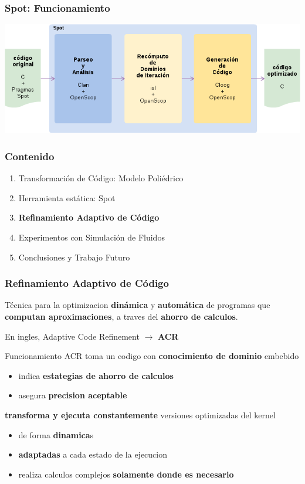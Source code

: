 \documentclass{beamer}\usetheme{Madrid} %
\begin{document}
\begin{frame}
\frametitle{Spot: Funcionamiento}
\includegraphics[scale=0.45]{img/spot_pipe_simple.png}
\end{frame}
\begin{frame} 
\frametitle{Contenido} 
\begin{enumerate}
\item Transformación de Código: Modelo Poliédrico
\item Herramienta estática: Spot
\item \textbf{Refinamiento Adaptivo de Código}
\item Experimentos con Simulación de Fluidos
\item Conclusiones y Trabajo Futuro
\end{enumerate}
\end{frame} 
\begin{frame}
\frametitle{Refinamiento Adaptivo de Código} 
\begin{block}{}
Técnica para la optimizacion \textbf{dinámica} y \textbf{automática} de programas que 
\textbf{computan aproximaciones}, a traves del \textbf{ahorro de calculos}.
\end{block}
En ingles, Adaptive Code Refinement $\rightarrow$ \textbf{ACR}
\begin{block}{Funcionamiento} 
ACR toma un codigo con \textbf{conocimiento de dominio} embebido
\begin{itemize}
	\item indica \textbf{estategias de ahorro de calculos}
	\item asegura \textbf{precision aceptable}
\end{itemize}
\textbf{transforma y ejecuta constantemente} versiones optimizadas del kernel
\begin{itemize}
	\item de forma \textbf{dinamica}s
	\item \textbf{adaptadas} a cada estado de la ejecucion
	\item realiza calculos complejos \textbf{solamente donde es necesario} 
\end{itemize}
\end{block}
\end{frame}
\end{document}
